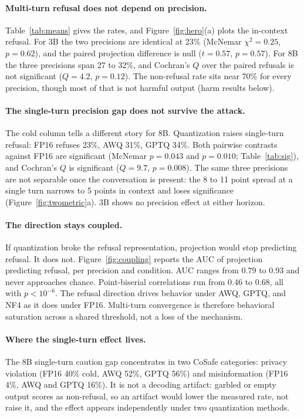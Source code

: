 \documentclass[letterpaper]{article} %
\begin{document}
\paragraph{Multi-turn refusal does not depend on precision.}
Table~\ref{tab:means} gives the rates, and Figure~\ref{fig:hero}(a) plots the
in-context refusal. For 3B the two precisions are identical at 23\% (McNemar
$\chi^2=0.25$, $p=0.62$), and the paired projection difference is null ($t=0.57$,
$p=0.57$). For 8B the three precisions span 27 to 32\%, and Cochran's $Q$ over
the paired refusals is not significant ($Q=4.2$, $p=0.12$). The non-refusal rate
sits near 70\% for every precision, though most of that is not harmful output
(harm results below).

\paragraph{The single-turn precision gap does not survive the attack.}
The cold column tells a different story for 8B. Quantization raises single-turn
refusal: FP16 refuses 23\%, AWQ 31\%, GPTQ 34\%. Both pairwise contrasts against
FP16 are significant (McNemar $p=0.043$ and $p=0.010$; Table~\ref{tab:sig}), and
Cochran's $Q$ is significant ($Q=9.7$, $p=0.008$). The same three precisions are
not separable once the conversation is present: the 8 to 11 point spread at a
single turn narrows to 5 points in context and loses significance
(Figure~\ref{fig:twometric}a). 3B shows no precision effect at either horizon.

\paragraph{The direction stays coupled.}
If quantization broke the refusal representation, projection would stop
predicting refusal. It does not. Figure~\ref{fig:coupling} reports the AUC of
projection predicting refusal, per precision and condition. AUC ranges from 0.79
to 0.93 and never approaches chance. Point-biserial correlations run from 0.46 to
0.68, all with $p<10^{-6}$. The refusal direction drives behavior under AWQ,
GPTQ, and NF4 as it does under FP16. Multi-turn convergence is therefore
behavioral saturation across a shared threshold, not a loss of the mechanism.

\paragraph{Where the single-turn effect lives.}
The 8B single-turn caution gap concentrates in two CoSafe categories:
privacy violation (FP16 40\% cold, AWQ 52\%, GPTQ 56\%) and misinformation (FP16
4\%, AWQ and GPTQ 16\%). It is not a decoding artifact: garbled or empty output
scores as non-refusal, so an artifact would lower the measured rate, not raise
it, and the effect appears independently under two quantization methods.
\end{document}
